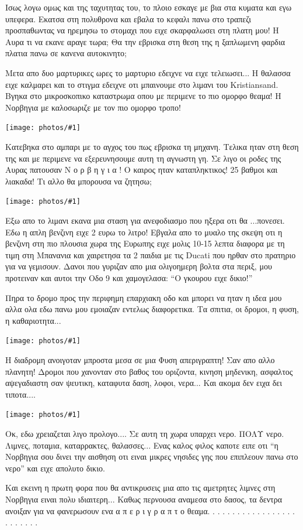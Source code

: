 \documentclass[11pt, letterpaper]{book}
\newcommand\photo[1]{\begin{center}\noindent\texttt{[image: photos/\#1]}\end{center}}
\begin{document}
Ισως λογω ομως και της ταχυτητας του, το πλοιο εσκαγε με βια στα κυματα και εγω υπεφερα. Εκατσα στη πολυθρονα και εβαλα το κεφαλι πανω στο τραπεζι προσπαθωντας να ηρεμησω το στομαχι που ειχε σκαρφαλωσει στη πλατη μου! Η Αυρα τι να εκανε αραγε τωρα; Θα την εβρισκα στη θεση της η ξαπλωμενη φαρδια πλατια πανω σε κανενα αυτοκινητο; 

Μετα απο δυο μαρτυρικες ωρες το μαρτυριο εδειχνε να ειχε τελειωσει... Η θαλασσα ειχε καλμαρει και το στιγμα εδειχνε οτι μπαινουμε στο λιμανι του Kristiansand. 
Βγηκα στο μικροσκοπικο καταστρωμα οπου με περιμενε το πιο ομορφο θεαμα! Η Νορβηγια με καλοσωριζε με τον πιο ομορφο τροπο! 

\photo{147.jpg}

Κατεβηκα στο αμπαρι με το αγχος του πως εβρισκα τη μηχανη. Τελικα ηταν στη θεση της και με περιμενε να εξερευνησουμε αυτη τη αγνωστη γη. 
Σε λιγο οι ροδες της Αυρας πατουσαν Ν ο ρ β η γ ι α ! 
Ο καιρος ηταν καταπληκτικος! 25 βαθμοι και λιακαδα! Τι αλλο θα μπορουσα να ζητησω; 

\photo{148.jpg}

Εξω απο το λιμανι εκανα μια σταση για ανεφοδιασμο που ηξερα οτι θα ...πονεσει. Εδω η απλη βενζινη ειχε 2 ευρω το λιτρο! Εβγαλα απο το μυαλο της σκεψη οτι η βενζινη στη πιο πλουσια χωρα της Ευρωπης ειχε μολις 10-15 λεπτα διαφορα με τη τιμη στη Μπανανια και χαιρετησα τα 2 παιδια με τις Ducati που ηρθαν στο πρατηριο για να γεμισουν. Δανοι που γυριζαν απο μια ολιγοημερη βολτα στα περιξ, μου προτειναν και αυτοι την Οδο 9 και χαμογελασα: ``Ο γκουρου ειχε δικιο!''

Πηρα το δρομο προς την περιφημη επαρχιακη οδο και μπορει να ηταν η ιδεα μου αλλα ολα εδω πανω μου εμοιαζαν εντελως διαφορετικα. Τα σπιτια, οι δρομοι, η φυση, η καθαριοτητα... 

\photo{149.jpg}

H διαδρομη ανοιγοταν μπροστα μεσα σε μια Φυση απεριγραπτη! Σαν απο αλλο πλανητη! Δρομοι που χανονταν στο βαθος του οριζοντα, κινηση μηδενικη, ασφαλτος αψεγαδιαστη σαν ψευτικη, καταφυτα δαση, λοφοι, νερα...
Και ακομα δεν ειχα δει τιποτα.... 

\photo{150.jpg}

Οκ, εδω χρειαζεται λιγο προλογο....
Σε αυτη τη χωρα υπαρχει νερο. ΠΟΛΥ νερο. Λιμνες, ποταμια, καταρρακτες, θαλασσες... 
Ενας καλος φιλος καποτε ειπε οτι ``η Νορβηγια σου δινει την αισθηση οτι ειναι μικρες νησιδες γης που επιπλεουν πανω στο νερο'' και ειχε απολυτο δικιο.

Και εκεινη η πρωτη φορα που θα αντικρυσεις μια απο τις αμετρητες λιμνες στη Νορβηγια ειναι πολυ ιδιαιτερη... 
Καθως περνουσα αναμεσα στο δασος, τα δεντρα ανοιξαν για να φανερωσουν ενα α π ε ρ ι γ ρ α π τ ο θεαμα.
.
.
.
.
.
.
.
.
.
.
.
.
.
.
.
.
.
.
.
.
.
.
.
.
\end{document}

